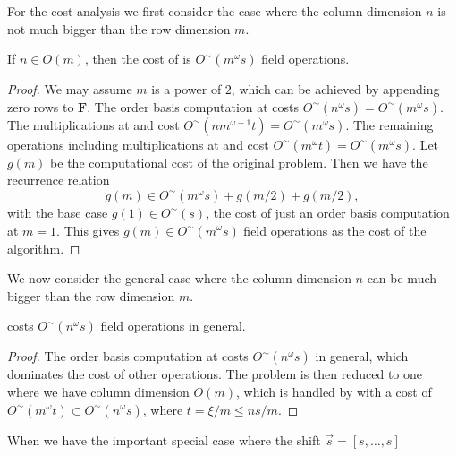 For the cost analysis we first consider the case where the column
dimension $n$ is not much bigger than the row dimension $m$. 
\begin{thm}
\label{thm:costLowColDimension}If $n\in O\left(m\right)$, then the
cost of  is $O^{\sim}\left(m^{\omega}s\right)$
field operations.%
\begin{comment}
to compute a $\vec{s}$-minimal kernel basis of $\mathbf{F}$. 
\end{comment}
\end{thm}
\begin{proof}
We may assume $m$ is a power of $2$, which can be achieved by appending
zero rows to $\mathbf{F}$. The order basis computation at 
costs $O^{\sim}\left(n^{\omega}s\right)=O^{\sim}\left(m^{\omega}s\right)$.
The multiplications at  and 
cost $O^{\sim}\left(nm^{\omega-1}t\right)=O^{\sim}\left(m^{\omega}s\right)$.
The remaining operations including multiplications at 
and  cost $O^{\sim}\left(m^{\omega}t\right)=O^{\sim}\left(m^{\omega}s\right)$.
Let $g(m)$ be the computational cost of the original problem. Then
we have the recurrence relation 
\[
g(m)\in O^{\sim}(m^{\omega}s)+g(m/2)+g(m/2),
\]
 with the base case $g(1)\in O^{\sim}\left(s\right)$, the cost of
just an order basis computation at $m=1.$ This gives $g(m)\in O^{\sim}(m^{\omega}s)$
field operations as the cost of the algorithm. 
\end{proof}
We now consider the general case where the column dimension $n$ can
be much bigger than the row dimension $m$. 
\begin{thm}
\label{thm:costGeneral}
costs $O^{\sim}\left(n^{\omega}s\right)$ field operations in general.\end{thm}
\begin{proof}
The order basis computation at  costs
$O^{\sim}\left(n^{\omega}s\right)$ in general, which dominates the
cost of other operations. The problem is then reduced to one where
we have column dimension $O\left(m\right)$, which is handled by 
with a cost of $O^{\sim}\left(m^{\omega}t\right)\subset O^{\sim}\left(n^{\omega}s\right)$,
where $t=\xi/m\le ns/m$. 
\end{proof}
When we have the important special case where the shift $\vec{s}=\left[s,\dots,s\right]$
